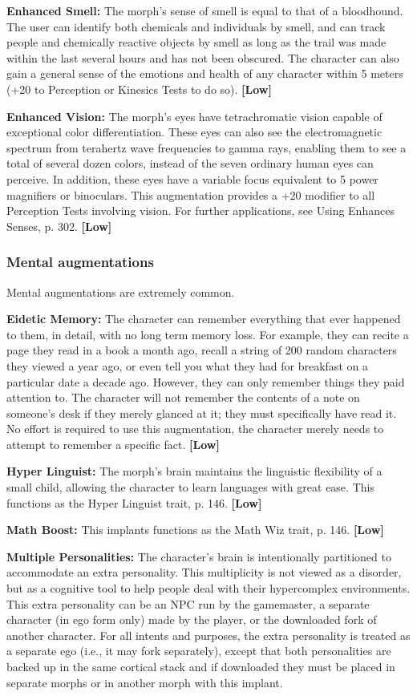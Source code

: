 \textbf{Enhanced Smell:} The morph’s sense of smell is equal to that of a bloodhound. The user can identify both chemicals and individuals by smell, and can track people and chemically reactive objects by smell as long as the trail was made within the last several hours and has not been obscured. The character can also gain a general sense of the emotions and health of any character within 5 meters (+20 to Perception or Kinesics Tests to do so). \textbf{[Low]} 

\textbf{Enhanced Vision:} The morph’s eyes have tetrachromatic vision capable of exceptional color differentiation. These eyes can also see the electromagnetic spectrum from terahertz wave frequencies to gamma rays, enabling them to see a total of several dozen colors, instead of the seven ordinary human eyes can perceive. In addition, these eyes have a variable focus equivalent to 5 power magnifiers or binoculars. This augmentation provides a +20 modifier to all Perception Tests involving vision. For further applications, see Using Enhances Senses, p. 302. \textbf{[Low]} 

\subsubsection{Mental augmentations} 

Mental augmentations are extremely common. 

\textbf{Eidetic Memory:} The character can remember everything that ever happened to them, in detail, with no long term memory loss. For example, they can recite a page they read in a book a month ago, recall a string of 200 random characters they viewed a year ago, or even tell you what they had for breakfast on a particular date a decade ago. However, they can only remember things they paid attention to. The character will not remember the contents of a note on someone’s desk if they merely glanced at it; they must specifically have read it. No effort is required to use this augmentation, the character merely needs to attempt to remember a specific fact. \textbf{[Low]} 

\textbf{Hyper Linguist:} The morph’s brain maintains the linguistic flexibility of a small child, allowing the character to learn languages with great ease. This functions as the Hyper Linguist trait, p. 146. \textbf{[Low]} 

\textbf{Math Boost:} This implants functions as the Math Wiz trait, p. 146. \textbf{[Low]} 

\textbf{Multiple Personalities:} The character’s brain is intentionally partitioned to accommodate an extra personality. This multiplicity is not viewed as a disorder, but as a cognitive tool to help people deal with their hypercomplex environments. This extra personality can be an NPC run by the gamemaster, a separate character (in ego form only) made by the player, or the downloaded fork of another character. For all intents and purposes, the extra personality is treated as a separate ego (i.e., it may fork separately), except that both personalities are backed up in the same cortical stack and if downloaded they must be placed in separate morphs or in another morph with this implant. 

